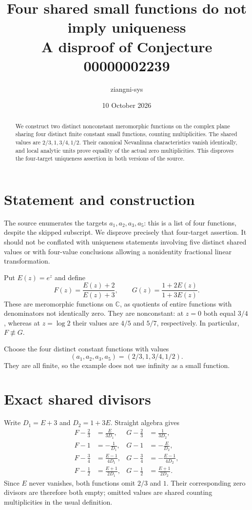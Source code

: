 \documentclass[11pt]{article}
\title{Four shared small functions do not imply uniqueness\\A disproof of Conjecture 00000002239}
\author{ziangni-sys}\date{10 October 2026}
\begin{document}
\maketitle
\begin{abstract}
We construct two distinct nonconstant meromorphic functions on the complex plane sharing four distinct finite constant small functions, counting multiplicities. The shared values are $2/3,1,3/4,1/2$. Their canonical Nevanlinna characteristics vanish identically, and local analytic units prove equality of the actual zero multiplicities. This disproves the four-target uniqueness assertion in both versions of the source.
\end{abstract}

\section{Statement and construction}
The source enumerates the targets $a_1,a_2,a_3,a_5$: this is a list of four functions, despite the skipped subscript. We disprove precisely that four-target assertion. It should not be conflated with uniqueness statements involving five distinct shared values or with four-value conclusions allowing a nonidentity fractional linear transformation.

Put $E(z)=e^z$ and define
\[
 F(z)=\frac{E(z)+2}{E(z)+3},\qquad
 G(z)=\frac{1+2E(z)}{1+3E(z)}.
\]
These are meromorphic functions on $\mathbb C$, as quotients of entire functions with denominators not identically zero. They are nonconstant: at $z=0$ both equal $3/4$, whereas at $z=\log 2$ their values are $4/5$ and $5/7$, respectively. In particular, $F\not\equiv G$.

Choose the four distinct constant functions with values
\[
(a_1,a_2,a_3,a_5)=(2/3,1,3/4,1/2).
\]
They are all finite, so the example does not use infinity as a small function.

\section{Exact shared divisors}
Write $D_1=E+3$ and $D_2=1+3E$. Straight algebra gives
\begin{align*}
 F-\tfrac23&=\frac{E}{3D_1},&
 G-\tfrac23&=\frac{1}{3D_2},\\
 F-1&=-\frac1{D_1},&G-1&=-\frac{E}{D_2},\\
 F-\tfrac34&=\frac{E-1}{4D_1},&
 G-\tfrac34&=-\frac{E-1}{4D_2},\\
 F-\tfrac12&=\frac{E+1}{2D_1},&
 G-\tfrac12&=\frac{E+1}{2D_2}.
\end{align*}
Since $E$ never vanishes, both functions omit $2/3$ and $1$. Their corresponding zero divisors are therefore both empty; omitted values are shared counting multiplicities in the usual definition.
\end{document}
